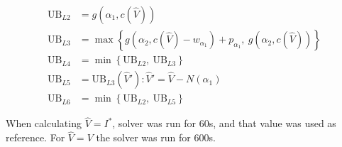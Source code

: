 \documentclass{article}
\begin{document}
\begin{align*}
\mathrm{UB}_{L2} &= g(\alpha_1, c(\hat{V})) \\
\mathrm{UB}_{L3} &= \max\left\{g(\alpha_2, c(\hat{V}) - w_{\alpha_1}) + p_{\alpha_1},\ g(\alpha_2, c(\hat{V}))\right\} \\
\mathrm{UB}_{L4} &= \min\left\{\mathrm{UB}_{L2},\ \mathrm{UB}_{L3}\right\} \\
\mathrm{UB}_{L5} &= \mathrm{UB}_{L3}(\hat{V}') : \hat{V}' = \hat{V} - N(\alpha_1) \\
\mathrm{UB}_{L6} &= \min\left\{\mathrm{UB}_{L2},\ \mathrm{UB}_{L5}\right\}
\end{align*}

When calculating $\hat{V} = I^*$, solver was run for 60s, and that value was
used as reference. For $\hat{V} = V$ the solver was run for 600s.










\end{document}
